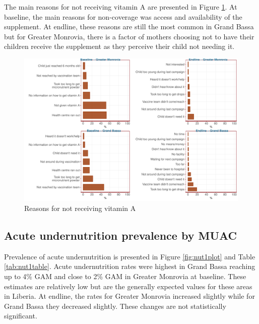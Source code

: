 \documentclass[12pt,a4paper]{article}
\begin{document}
The main reasons for not receiving vitamin A are presented in Figure \ref{fig:vit2plot}. At baseline, the main reasons for non-coverage was access and availability of the supplement. At endline, these reasons are still the most common in Grand Bassa but for Greater Monrovia, there is a factor of mothers choosing not to have their children receive the supplement as they perceive their child not needing it.

\begin{figure}[H]

{\centering \includegraphics{liberiaCoverageFinalReport_files/figure-latex/vit2plot-1} 

}

\caption{Reasons for not receiving vitamin A}\label{fig:vit2plot}
\end{figure}

\newpage

\hypertarget{acute-undernutrition-prevalence-by-muac}{%
\subsection{Acute undernutrition prevalence by MUAC}\label{acute-undernutrition-prevalence-by-muac}}

Prevalence of acute undernutrition is presented in Figure \ref{fig:nut1plot} and Table \ref{tab:nut1table}. Acute undernutrition rates were highest in Grand Bassa reaching up to 4\% GAM and close to 2\% GAM in Greater Monrovia at baseline. These estimates are relatively low but are the generally expected values for these areas in Liberia. At endline, the rates for Greater Monrovia increased slightly while for Grand Bassa they decreased slightly. These changes are not statistically significant.
\end{document}
